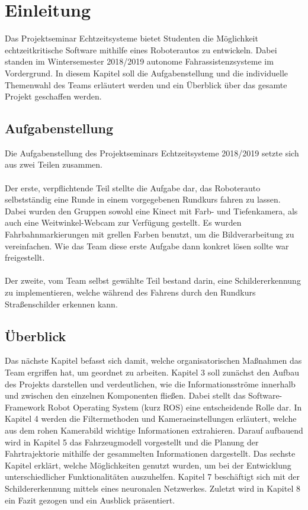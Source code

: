 \section{Einleitung}
Das Projektseminar Echtzeitsysteme bietet Studenten die M\"oglichkeit echtzeitkritische Software mithilfe eines Roboterautos zu entwickeln. Dabei standen im Wintersemester 2018/2019 autonome Fahrassistenzsysteme im Vordergrund. In diesem Kapitel soll die Aufgabenstellung und die individuelle Themenwahl des Teams erl\"autert werden und ein \"Uberblick \"uber das gesamte Projekt geschaffen werden.

\subsection{Aufgabenstellung}
Die Aufgabenstellung des Projektseminars Echtzeitsysteme 2018/2019 setzte sich aus zwei Teilen zusammen. \\\\
Der erste, verpflichtende Teil stellte die Aufgabe dar, das Roboterauto selbstst\"andig eine Runde in einem vorgegebenen Rundkurs fahren zu lassen. Dabei wurden den Gruppen sowohl eine Kinect mit Farb- und Tiefenkamera, als auch eine Weitwinkel-Webcam zur Verf\"ugung gestellt. Es wurden Fahrbahnmarkierungen mit grellen Farben benutzt, um die Bildverarbeitung zu vereinfachen. Wie das Team diese erste Aufgabe dann konkret l\"osen sollte war freigestellt. \\\\
Der zweite, vom Team selbst gew\"ahlte Teil bestand darin, eine Schildererkennung zu implementieren, welche w\"ahrend des Fahrens durch den Rundkurs Stra\ss{}enschilder erkennen kann.

\subsection{\"Uberblick}
Das n\"achste Kapitel befasst sich damit, welche organisatorischen Ma\ss{}nahmen das Team ergriffen hat, um geordnet zu arbeiten. Kapitel 3 soll zun\"achst den Aufbau des Projekts darstellen und verdeutlichen, wie die Informationsstr\"ome innerhalb und zwischen den einzelnen Komponenten flie\ss{}en. Dabei stellt das Software-Framework Robot Operating System\cite{ROS} (kurz ROS) eine entscheidende Rolle dar. In Kapitel 4 werden die Filtermethoden und Kameraeinstellungen erl\"autert, welche aus dem rohen Kamerabild wichtige Informationen extrahieren. Darauf aufbauend wird in Kapitel 5 das Fahrzeugmodell vorgestellt und die Planung der Fahrtrajektorie mithilfe der gesammelten Informationen dargestellt. Das sechste Kapitel erkl\"art, welche M\"oglichkeiten genutzt wurden, um bei der Entwicklung unterschiedlicher Funktionalit\"aten auszuhelfen. Kapitel 7 besch\"aftigt sich mit der Schildererkennung mittels eines neuronalen Netzwerkes. Zuletzt wird in Kapitel 8 ein Fazit gezogen und ein Ausblick pr\"asentiert.